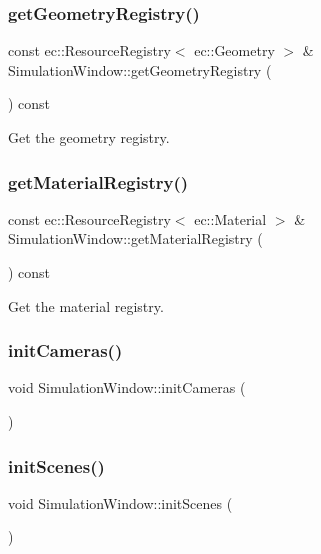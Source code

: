 \subsubsection{\texorpdfstring{get\+Geometry\+Registry()}{getGeometryRegistry()}}
{\footnotesize\ttfamily const ec\+::\+Resource\+Registry$<$ ec\+::\+Geometry $>$ \& Simulation\+Window\+::get\+Geometry\+Registry (\begin{DoxyParamCaption}{ }\end{DoxyParamCaption}) const}

Get the geometry registry. \mbox{\label{class_simulation_window_a0be5e363792b95388f1dfae85560c5f7}} 
\subsubsection{\texorpdfstring{get\+Material\+Registry()}{getMaterialRegistry()}}
{\footnotesize\ttfamily const ec\+::\+Resource\+Registry$<$ ec\+::\+Material $>$ \& Simulation\+Window\+::get\+Material\+Registry (\begin{DoxyParamCaption}{ }\end{DoxyParamCaption}) const}

Get the material registry. \mbox{\label{class_simulation_window_a787e405dd71c59fcf2dd58e75d233020}} 
\subsubsection{\texorpdfstring{init\+Cameras()}{initCameras()}}
{\footnotesize\ttfamily void Simulation\+Window\+::init\+Cameras (\begin{DoxyParamCaption}{ }\end{DoxyParamCaption})}

\mbox{\label{class_simulation_window_a60ebe43a626ec7acebadc93d37de8b70}} 
\subsubsection{\texorpdfstring{init\+Scenes()}{initScenes()}}
{\footnotesize\ttfamily void Simulation\+Window\+::init\+Scenes (\begin{DoxyParamCaption}{ }\end{DoxyParamCaption})}

